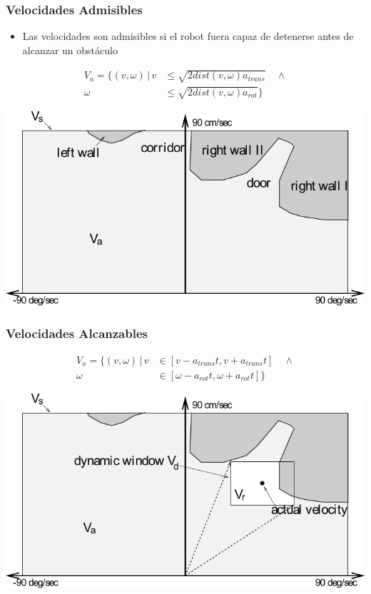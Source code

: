 \begin{frame}
    \frametitle{Velocidades Admisibles}
    
    \begin{itemize}
        \item Las velocidades son admisibles si el robot fuera capaz de detenerse antes de alcanzar un obstáculo
    \end{itemize}
    
    \begin{align*}
        V_{a} = \{ (v,\omega) \, | \,
              v &\leq \sqrt{2 dist(v,\omega) a_{trans}} \quad \land \\
         \omega &\leq \sqrt{2 dist(v,\omega) a_{rot}} \}
    \end{align*}
    
    \begin{center}
        \includegraphics[width=0.6\columnwidth]{images/dynamic_window_approach_admissible_velocities.pdf}
    \end{center}
    
\end{frame}

\begin{frame}
    \frametitle{Velocidades Alcanzables}
    
    \begin{align*}
        V_{a} = \{ (v,\omega) \, | \,
        v &\in \left[ v - a_{trans} t, v + a_{trans} t \right] \quad \land \\
        \omega &\in \left[ \omega - a_{rot} t, \omega + a_{rot} t \right] \}
    \end{align*}
    
    \begin{center}
        \includegraphics[width=0.7\columnwidth]{images/dynamic_window_approach_recheable_velocities.pdf}
    \end{center}
    
\end{frame}

